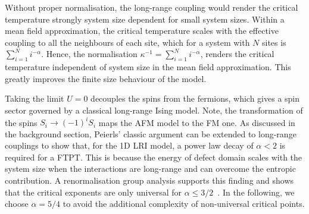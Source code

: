 Without proper normalisation, the long-range coupling would render the critical temperature strongly system size dependent for small system sizes. Within a mean field approximation, the critical temperature scales with the effective coupling to all the neighbours of each site, which for a system with \(N\) sites is \(\sum_{i=1}^{N} i^{-\alpha}\). Hence, the normalisation \(\kappa^{-1} = \sum_{i=1}^{N} i^{-\alpha}\), renders the critical temperature independent of system size in the mean field approximation. This greatly improves the finite size behaviour of the model.

Taking the limit \(U = 0\) decouples the spins from the fermions, which gives a spin sector governed by a classical long-range Ising model. Note, the transformation of the spins \(S_i \to (-1)^{i} S_i\) maps the AFM model to the FM one. As discussed in the background section, Peierls' classic argument can be extended to long-range couplings to show that, for the 1D LRI model, a power law decay of \(\alpha < 2\) is required for a FTPT. This is because the energy of defect domain scales with the system size when the interactions are long-range and can overcome the entropic contribution. A renormalisation group analysis supports this finding and shows that the critical exponents are only universal for \(\alpha \leq 3/2\)~\autocite{ruelleStatisticalMechanicsOnedimensional1968,thoulessLongRangeOrderOneDimensional1969,angeliniRelationsShortrangeLongrange2014}. In the following, we choose \(\alpha = 5/4\) to avoid the additional complexity of non-universal critical points.
